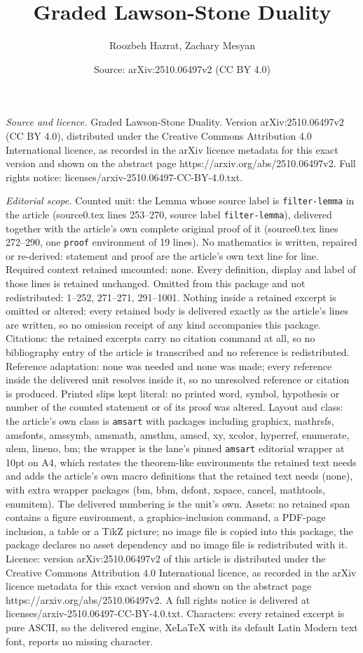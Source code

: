 \documentclass[10pt,a4paper]{amsart}
\title[Graded Lawson-Stone Duality]{Graded Lawson-Stone Duality}
\author{Roozbeh Hazrat, Zachary Mesyan}
\date{Source: arXiv:2510.06497v2 (CC BY 4.0)}
\begin{document}
\maketitle

\noindent\emph{Source and licence.} Graded Lawson-Stone Duality. Version arXiv:2510.06497v2 (CC BY 4.0), distributed under the Creative Commons Attribution 4.0 International licence, as recorded in the arXiv licence metadata for this exact version and shown on the abstract page https://arxiv.org/abs/2510.06497v2. Full rights notice: licenses/arxiv-2510.06497-CC-BY-4.0.txt.\par\smallskip

\noindent\textit{Editorial scope.} Counted unit: the Lemma whose source label is \texttt{filter-lemma} in the article (source0.tex lines 253--270, source label \texttt{filter-lemma}), delivered together with the article's own complete original proof of it (source0.tex lines 272--290, one \texttt{proof} environment of 19 lines). No mathematics is written, repaired or re-derived: statement and proof are the article's own text line for line. Required context retained uncounted: none. Every definition, display and label of those lines is retained unchanged. Omitted from this package and not redistributed: 1--252, 271--271, 291--1001. Nothing inside a retained excerpt is omitted or altered: every retained body is delivered exactly as the article's lines are written, so no omission receipt of any kind accompanies this package. Citations: the retained excerpts carry no citation command at all, so no bibliography entry of the article is transcribed and no reference is redistributed. Reference adaptation: none was needed and none was made; every reference inside the delivered unit resolves inside it, so no unresolved reference or citation is produced. Printed slips kept literal: no printed word, symbol, hypothesis or number of the counted statement or of its proof was altered. Layout and class: the article's own class is \texttt{amsart} with packages including graphicx, mathrsfs, amsfonts, amssymb, amsmath, amsthm, amscd, xy, xcolor, hyperref, enumerate, ulem, lineno, bm; the wrapper is the lane's pinned \texttt{amsart} editorial wrapper at 10pt on A4, which restates the theorem-like environments the retained text needs and adds the article's own macro definitions that the retained text needs (none), with extra wrapper packages (bm, bbm, dsfont, xspace, cancel, mathtools, enumitem). The delivered numbering is the unit's own. Assets: no retained span contains a figure environment, a graphics-inclusion command, a PDF-page inclusion, a table or a TikZ picture; no image file is copied into this package, the package declares no asset dependency and no image file is redistributed with it. Licence: version arXiv:2510.06497v2 of this article is distributed under the Creative Commons Attribution 4.0 International licence, as recorded in the arXiv licence metadata for this exact version and shown on the abstract page https://arxiv.org/abs/2510.06497v2. A full rights notice is delivered at licenses/arxiv-2510.06497-CC-BY-4.0.txt. Characters: every retained excerpt is pure ASCII, so the delivered engine, XeLaTeX with its default Latin Modern text font, reports no missing character.
\end{document}
